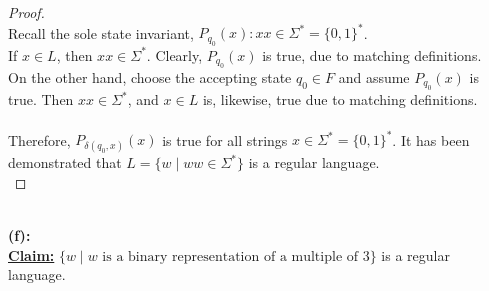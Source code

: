 \documentclass[12pt]{article}
\begin{document}
\begin{proof}
    \\
    Recall the sole state invariant, $P_{q_0}(x): xx \in \Sigma^* = \{0, 1\}^*$. \\
    If $x \in L$, then $xx \in \Sigma^*$. Clearly, $P_{q_0}(x)$ is true, due to matching definitions. \\
    On the other hand, choose the accepting state $q_0 \in F$ and assume $P_{q_0}(x)$ is true. Then $xx \in \Sigma^*$, and $x \in L$ is, likewise, true due to matching definitions. \\
    \\
    Therefore, $P_{\delta(q_0, x)}(x)$ is true for all strings $x \in \Sigma^* = \{0, 1\}^*$. It has been demonstrated that $L = \{ w \mid ww \in \Sigma^* \}$ is a regular language. \\
\end{proof}
\leavevmode\\
\textbf{(f):} \\
\textbf{\underline{Claim:}} $\{ w \mid w \text{ is a binary representation of a multiple of 3} \}$ is a regular language.
\end{document}
